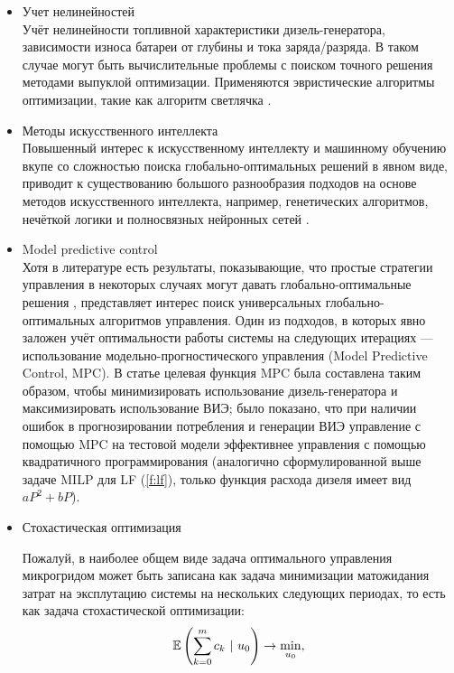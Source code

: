 \begin{itemize}
    \item Учет нелинейностей \\
    Учёт нелинейности топливной характеристики дизель-генератора,
    зависимости износа батареи от глубины и тока заряда/разряда.
    В таком случае могут быть вычислительные проблемы с поиском точного решения методами выпуклой оптимизации.
    Применяются эвристические алгоритмы оптимизации, такие как алгоритм светлячка \cite{Sufyan2019}.
    
    \item Методы искусственного интеллекта\\
    Повышенный интерес к искусственному интеллекту и машинному обучению вкупе со сложностью поиска глобально-оптимальных решений в явном виде, приводит к существованию большого разнообразия подходов на основе методов искусственного интеллекта, например, генетических алгоритмов, нечёткой логики и полносвязных нейронных сетей \cite{Olatomiwa2016, kerdphol2016rbf, chaouachi2012multiobjective, jafari2018adaptive}.
    
    \item Model predictive control \\
    Хотя в литературе есть результаты, показывающие, что простые стратегии управления в некоторых случаях могут давать глобально-оптимальные решения \cite{Barley1996}, представляет интерес поиск универсальных глобально-оптимальных алгоритмов управления.
    Один из подходов, в которых явно заложен учёт оптимальности работы системы на следующих итерациях --- использование модельно-прогностического управления (Model Predictive Control, MPC).
    В статье \cite{Tazvinga2014} целевая функция MPC была составлена таким образом, чтобы минимизировать использование дизель-генератора и максимизировать использование ВИЭ; 
    было показано, что при наличии ошибок в прогнозировании потребления и генерации ВИЭ управление с помощью MPC на тестовой модели эффективнее управления с помощью квадратичного программирования (аналогично сформулированной выше задаче MILP для LF (\ref{f:lf}), только функция расхода дизеля имеет вид $aP^2 + bP$).
    
    \item Стохастическая оптимизация
    
    
    Пожалуй, в наиболее общем виде задача оптимального управления микрогридом может быть записана как задача минимизации матожидания затрат на эксплутацию системы на нескольких следующих периодах, то есть как задача стохастической оптимизации:
    \begin{equation}
        \operatorname*{\mathbb{E}}\left( \sum_{k=0}^m c_k ~\vert~ u_0 \right) \rightarrow \min\limits_{u_0},
    \end{equation}
    

\end{itemize}
